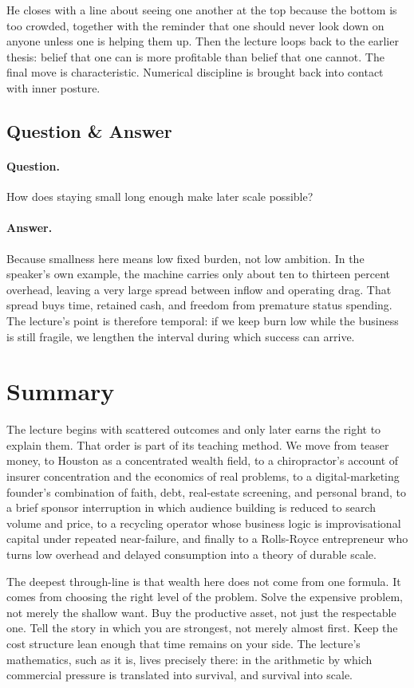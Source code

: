 He closes with a line about seeing one another at the top because the bottom is too crowded, together with the reminder that one should never look down on anyone unless one is helping them up. Then the lecture loops back to the earlier thesis: belief that one can is more profitable than belief that one cannot. The final move is characteristic. Numerical discipline is brought back into contact with inner posture.

\subsection{Question \& Answer}

\paragraph{Question.} How does staying small long enough make later scale possible?

\paragraph{Answer.} Because smallness here means low fixed burden, not low ambition. In the speaker's own example, the machine carries only about ten to thirteen percent overhead, leaving a very large spread between inflow and operating drag. That spread buys time, retained cash, and freedom from premature status spending. The lecture's point is therefore temporal: if we keep burn low while the business is still fragile, we lengthen the interval during which success can arrive.

\section{Summary}

The lecture begins with scattered outcomes and only later earns the right to explain them. That order is part of its teaching method. We move from teaser money, to Houston as a concentrated wealth field, to a chiropractor's account of insurer concentration and the economics of real problems, to a digital-marketing founder's combination of faith, debt, real-estate screening, and personal brand, to a brief sponsor interruption in which audience building is reduced to search volume and price, to a recycling operator whose business logic is improvisational capital under repeated near-failure, and finally to a Rolls-Royce entrepreneur who turns low overhead and delayed consumption into a theory of durable scale.

The deepest through-line is that wealth here does not come from one formula. It comes from choosing the right level of the problem. Solve the expensive problem, not merely the shallow want. Buy the productive asset, not just the respectable one. Tell the story in which you are strongest, not merely almost first. Keep the cost structure lean enough that time remains on your side. The lecture's mathematics, such as it is, lives precisely there: in the arithmetic by which commercial pressure is translated into survival, and survival into scale.
